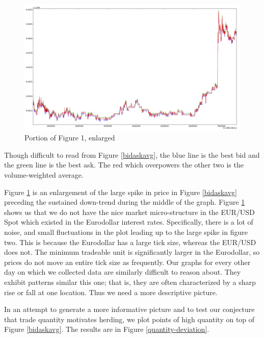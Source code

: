 \begin{figure}[th]
  \includegraphics[width=\textwidth]{figures/smoothed_avg_20131204_zoomed.png}
  \caption{Portion of Figure 1, enlarged}
  \label{bidaskavg2}
\end{figure}

Though difficult to read from Figure \ref{bidaskavg}, the blue line is the best bid and the green line is the best ask. 
The red which overpowers the other two is the volume-weighted average.

Figure \ref{bidaskavg2} is an enlargement of the large spike in price in Figure \ref{bidaskavg} preceding the sustained down-trend during the middle of the graph.
Figure \ref{bidaskavg2} shows us that we do not have the nice market micro-structure in the EUR/USD Spot which existed in the Eurodollar interest rates.
Specifically, there is a lot of noise, and small fluctuations in the plot leading up to the large spike in figure two.
This is because the Eurodollar has a large tick size, whereas the EUR/USD does not.
The minimum tradeable unit is significantly larger in the Eurodollar, so prices do not move an entire tick size as frequently.  Our graphs for every other day on which we collected data are similarly difficult to reason about.  They exhibit patterns similar this one; that is, they are often characterized by a sharp rise or fall at one location.
Thus we need a more descriptive picture.

In an attempt to generate a more informative picture and to test our conjecture that trade quantity motivates herding, we plot points of high quantity on top of Figure \ref{bidaskavg}.
The results are in Figure \ref{quantity-deviation}.

